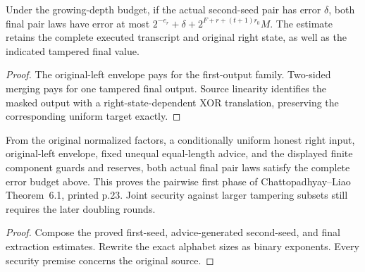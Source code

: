 \begin{theorem}
  \label{thm:lowerbounds-algebraic-affine-phase-one-final}
  \leanok
  Under the growing-depth budget, if the actual second-seed pair has
  error $\delta$, both final pair laws have error at most
  $2^{-e_r}+\delta+2^{F+r+(t+1)r_0}M$.
  The estimate retains the complete executed transcript and original
  right state, as well as the indicated tampered final value.
\end{theorem}
\begin{proof}
  \leanok
  The original-left envelope pays for the first-output family.
  Two-sided merging pays for one tampered final output. Source linearity
  identifies the masked output with a right-state-dependent XOR
  translation, preserving the corresponding uniform target exactly.
\end{proof}

\begin{theorem}
  \label{thm:lowerbounds-algebraic-affine-phase-one-extraction}
  \leanok
  From the original normalized factors, a conditionally uniform honest
  right input, original-left envelope, fixed unequal equal-length advice,
  and the displayed finite component guards and reserves, both actual
  final pair laws satisfy the complete error budget above.
  This proves the pairwise first phase of Chattopadhyay--Liao
  Theorem~6.1, printed p.23. Joint security against larger tampering
  subsets still requires the later doubling rounds.
\end{theorem}
\begin{proof}
  \leanok
  Compose the proved first-seed, advice-generated second-seed, and
  final extraction estimates. Rewrite the exact alphabet sizes as
  binary exponents. Every security premise concerns the original source.
\end{proof}

